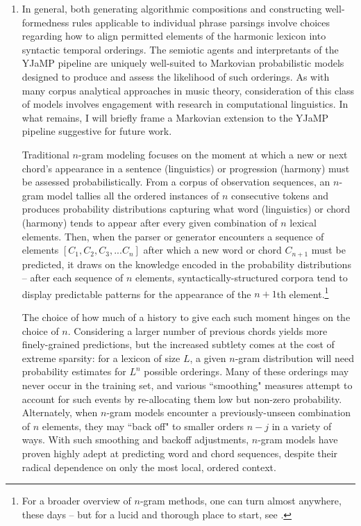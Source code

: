 \begin{enumerate}
	\item In general, both generating algorithmic compositions and constructing well-formedness rules applicable to individual phrase parsings involve choices regarding how to align permitted elements of the harmonic lexicon into syntactic temporal orderings.  The semiotic agents and interpretants of the YJaMP pipeline are uniquely well-suited to Markovian probabilistic models designed to produce and assess the likelihood of such orderings.  As with many corpus analytical approaches in music theory, consideration of this class of models involves engagement with research in computational linguistics.  In what remains, I will briefly frame a Markovian extension to the YJaMP pipeline suggestive for future work.
	
Traditional $n$-gram modeling focuses on the moment at which a new or next chord's appearance in a sentence (linguistics) or progression (harmony) must be assessed probabilistically.  From a corpus of observation sequences, an $n$-gram model tallies all the ordered instances of $n$ consecutive tokens and produces probability distributions capturing what word (linguistics) or chord (harmony) tends to appear after every given combination of $n$ lexical elements.  Then, when the parser or generator encounters a sequence of elements $[C_1,C_2,C_3,...C_n]$ after which a new word or chord $C_{n+1}$ must be predicted, it draws on the knowledge encoded in the probability distributions -- after each sequence of $n$ elements, syntactically-structured corpora tend to display predictable patterns for the appearance of the $n+1$th element.\footnote{For a broader overview of $n$-gram methods, one can turn almost anywhere, these days -- but for a lucid and thorough place to start, see \cite{jurafsky2000}.}

The choice of how much of a history to give each such moment hinges on the choice of $n$.  Considering a larger number of previous chords yields more finely-grained predictions, but the increased subtlety comes at the cost of extreme sparsity: for a lexicon of size $L$, a given $n$-gram distribution will need probability estimates for $L^n$ possible orderings.  Many of these orderings may never occur in the training set, and various ``smoothing" measures attempt to account for such events by re-allocating them low but non-zero probability.  Alternately, when $n$-gram models encounter a previously-unseen combination of $n$ elements, they may ``back off" to smaller orders $n-j$ in a variety of ways.  With such smoothing and backoff adjustments, $n$-gram models have proven highly adept at predicting word and chord sequences, despite their radical dependence on only the most local, ordered context.


\end{enumerate}
